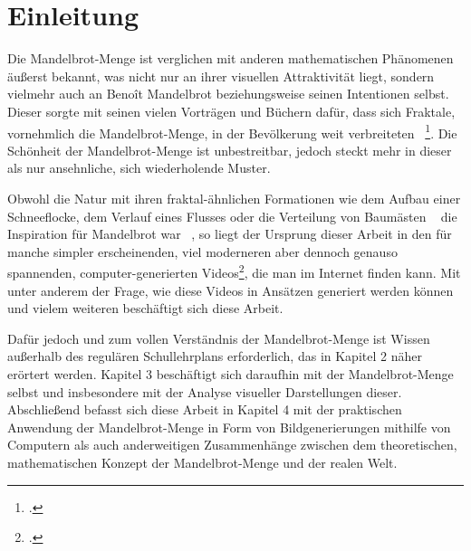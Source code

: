 \section{Einleitung}\label{sec:introduction}

Die Mandelbrot-Menge ist verglichen mit anderen mathematischen Phänomenen
äußerst bekannt, was nicht nur an ihrer visuellen Attraktivität liegt,
sondern vielmehr auch an Benoît Mandelbrot beziehungsweise seinen Intentionen selbst.
Dieser sorgte mit seinen vielen Vorträgen und Büchern dafür, dass sich Fraktale,
vornehmlich die Mandelbrot-Menge, in der Bevölkerung weit verbreiteten
~\footcite[
  {\glqq [\ldots] Mandelbrot should also be recognized for bridging the
  gap between art and mathematics [\ldots]\grqq.
  \textit{Übersetzt:} \glqq Mandelbrot sollte auch für die Verbindung zwischen
  Kunst und Mathematik anerkannt werden \grqq}
]{ibm_fractal_2011}.
Die Schönheit der Mandelbrot-Menge ist unbestreitbar, jedoch steckt mehr in dieser
als nur ansehnliche, sich wiederholende Muster.

Obwohl die Natur mit ihren fraktal-ähnlichen Formationen wie dem Aufbau einer
Schneeflocke, dem Verlauf eines Flusses oder die Verteilung von Baumästen
~\cite{nnart_fractals_nodate} die Inspiration für Mandelbrot war
~\cite{zink_kosmische_2014}, so liegt der Ursprung dieser Arbeit in den für
manche simpler erscheinenden, viel moderneren aber dennoch genauso spannenden,
computer-generierten Videos\footcite[Vgl. bspw.][]{maths_town_eye_2017},
die man im Internet finden kann.
Mit unter anderem der Frage, wie diese Videos in Ansätzen generiert werden können
und vielem weiteren beschäftigt sich diese Arbeit.

Dafür jedoch und zum vollen Verständnis der Mandelbrot-Menge ist Wissen außerhalb
des regulären Schullehrplans erforderlich, das in Kapitel 2 näher erörtert werden.
Kapitel 3 beschäftigt sich daraufhin mit der Mandelbrot-Menge selbst und insbesondere
mit der Analyse visueller Darstellungen dieser.
Abschließend befasst sich diese Arbeit in Kapitel 4 mit der praktischen Anwendung
der Mandelbrot-Menge in Form von Bildgenerierungen mithilfe von Computern als auch
anderweitigen Zusammenhänge zwischen dem theoretischen, mathematischen Konzept
der Mandelbrot-Menge und der realen Welt.